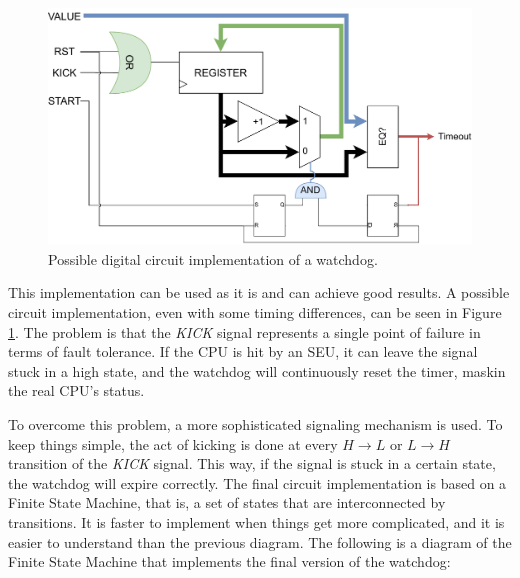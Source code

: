 \begin{figure}[H]
\centering
\includegraphics[width=0.8\linewidth]{images/chapter4/impl_schem_wd.pdf}
\caption{Possible digital circuit implementation of a watchdog.}
\label{fig:wd_scheme}
\end{figure}

This implementation can be used as it is and can achieve good results. A possible circuit implementation, even with some timing differences, can be seen in Figure \ref{fig:wd_scheme}. The problem is that the \textit{KICK} signal represents a single point of failure in terms of fault tolerance. If the CPU is hit by an SEU, it can leave the signal stuck in a high state, and the watchdog will continuously reset the timer, maskin the real CPU's status. \bigskip

To overcome this problem, a more sophisticated signaling mechanism is used. To keep things simple, the act of kicking is done at every $H\rightarrow L$ or $L\rightarrow H$ transition of the \textit{KICK} signal. This way, if the signal is stuck in a certain state, the watchdog will expire correctly. The final circuit implementation is based on a Finite State Machine, that is, a set of states that are interconnected by transitions. It is faster to implement when things get more complicated, and it is easier to understand than the previous diagram. The following is a diagram of the Finite State Machine that implements the final version of the watchdog:

